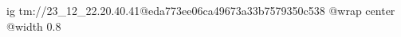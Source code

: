  
 
 
 
 

\qqSecOrig


\ifcmt
  ig tm://23_12_22.20.40.41@eda773ee06ca49673a33b7579350c538
  @wrap center
  @width 0.8
\fi

